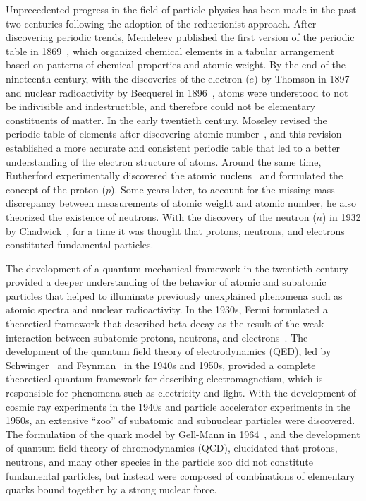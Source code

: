 Unprecedented progress in the field of particle physics has been made in the past two centuries following the adoption of the reductionist approach.
After discovering periodic trends, Mendeleev published the first version of the periodic table in 1869~\cite{mendeleev1869relationship}, which organized chemical elements in a tabular arrangement based on patterns of chemical properties and atomic weight.
By the end of the nineteenth century, with the discoveries of the electron ($e$) by Thomson in 1897~\cite{thomson1897xl} and nuclear radioactivity by Becquerel in 1896~\cite{becquerel1896radiations}, atoms were understood to not be indivisible and indestructible, and therefore could not be elementary constituents of matter.
In the early twentieth century, Moseley revised the periodic table of elements after discovering atomic number~\cite{Egdell2020}, and this revision established a more accurate and consistent periodic table that led to a better understanding of the electron structure of atoms.
Around the same time, Rutherford experimentally discovered the atomic nucleus~\cite{rutherford1911lxxix} and formulated the concept of the proton ($p$).
Some years later, to account for the missing mass discrepancy between measurements of atomic weight and atomic number, he also theorized the existence of neutrons.
With the discovery of the neutron ($n$) in 1932 by Chadwick~\cite{chadwick1932possible}, for a time it was thought that protons, neutrons, and electrons constituted fundamental particles.

The development of a quantum mechanical framework in the twentieth century provided a deeper understanding of the behavior of atomic and subatomic particles that helped to illuminate previously unexplained phenomena such as atomic spectra and nuclear radioactivity.
In the 1930s, Fermi formulated a theoretical framework that described beta decay as the result of the weak interaction between subatomic protons, neutrons, and electrons~\cite{Wilson:1968pwx}.
The development of the quantum field theory of electrodynamics (QED), led by Schwinger~\cite{PhysRev.74.1439} and Feynman~\cite{PhysRev.76.769} in the 1940s and 1950s, provided a complete theoretical quantum framework for describing electromagnetism, which is responsible for phenomena such as electricity and light.
With the development of cosmic ray experiments in the 1940s and particle accelerator experiments in the 1950s, an extensive ``zoo'' of subatomic and subnuclear particles were discovered.
The formulation of the quark model by Gell-Mann in 1964~\cite{GELLMANN1964214}, and the development of quantum field theory of chromodynamics (QCD), elucidated that protons, neutrons, and many other species in the particle zoo did not constitute fundamental particles, but instead were composed of combinations of elementary quarks bound together by a strong nuclear force.

